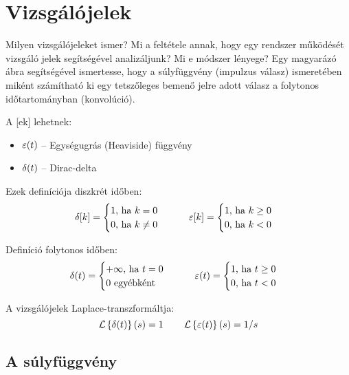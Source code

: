 \documentclass[../main.tex]{subfiles}
\begin{document}
\section{Vizsgálójelek}

\label{sec:3-14}

\begin{fulltheorem}
  Milyen vizsgálójeleket ismer? Mi a feltétele annak, hogy egy rendszer
  működését vizsgáló jelek segítségével analizáljunk? Mi e módszer lényege?
  Egy magyarázó ábra segítségével ismertesse, hogy a súlyfüggvény
  (impulzus válasz) ismeretében miként számítható ki egy tetszőleges bemenő
  jelre adott válasz a folytonos időtartományban (konvolúció).
\end{fulltheorem}

A [ek] lehetnek:
\begin{itemize}
  \item $\varepsilon(t)$ -- Egységugrás (Heaviside) függvény
  \item $\delta(t)$ -- Dirac-delta
\end{itemize}

Ezek definíciója diszkrét időben:
\[
  \delta[k] = \begin{cases}
    1 \text{, ha } k = 0    \\
    0 \text{, ha } k \neq 0 \\
  \end{cases}
  \qquad
  \varepsilon[k] = \begin{cases}
    1 \text{, ha } k \geq 0 \\
    0 \text{, ha } k < 0    \\
  \end{cases}
\]

Definíció folytonos időben:
\[
  \delta(t) = \begin{cases}
    + \infty \text{, ha } t = 0 \\
    0 \text{ egyébként}
  \end{cases}
  \qquad
  \varepsilon(t) = \begin{cases}
    1 \text{, ha } t \geq 0 \\
    0 \text{, ha } t < 0    \\
  \end{cases}
\]

A vizsgálójelek Laplace-transzformáltja:
\[
  \operatorname{\mathcal{L}} \left\{ \delta(t) \right\}(s) = 1
  \qquad
  \operatorname{\mathcal{L}} \left\{ \varepsilon(t) \right\} (s) = 1 / s
\]

\subsection{A súlyfüggvény}
\end{document}
